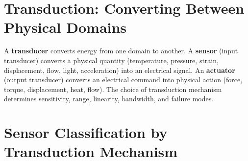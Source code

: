 \documentclass[11pt,letterpaper,twoside,openany]{book}
\begin{document}
\vspace{1em}

\section{Transduction: Converting Between Physical Domains}
A \textbf{transducer} converts energy from one domain to another. A \textbf{sensor} (input transducer) converts a physical quantity (temperature, pressure, strain, displacement, flow, light, acceleration) into an electrical signal. An \textbf{actuator} (output transducer) converts an electrical command into physical action (force, torque, displacement, heat, flow). The choice of transduction mechanism determines sensitivity, range, linearity, bandwidth, and failure modes.

\section{Sensor Classification by Transduction Mechanism}
\end{document}
